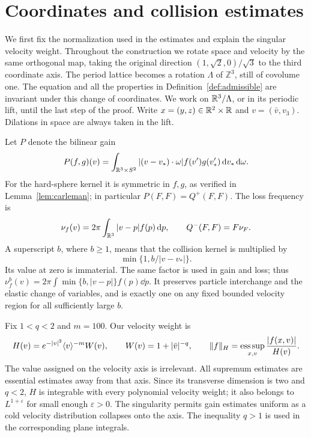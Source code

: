 \section{Coordinates and collision estimates}\label{sec:framework}

We first fix the normalization used in the estimates and explain the
singular velocity weight. Throughout the construction we rotate space
and velocity by the same orthogonal map, taking the original direction
\((1,\sqrt2,0)/\sqrt3\) to the third coordinate axis. The period lattice
becomes a rotation \(\Lambda\) of \(\mathbb Z^3\), still of covolume one.
The equation and all the properties in Definition~\ref{def:admissible}
are invariant under this change of coordinates. We work on
\(\mathbb R^3/\Lambda\), or in its periodic lift, until the last step of the
proof. Write \(x=(y,z)\in\mathbb R^2\times\mathbb R\) and
\(v=(\bar v,v_3)\). Dilations in space are always taken in the lift.

Let \(P\) denote the bilinear gain
\[
 P(f,g)(v)=\int_{\mathbb R^3\times S^2}
 |(v-v_*)\cdot\omega|f(v')g(v_*')\,\mathrm d v_*\,\mathrm d\omega.
\]
For the hard-sphere kernel it is symmetric in \(f,g\), as verified in
Lemma~\ref{lem:carleman}; in particular \(P(F,F)=Q^+(F,F)\).
The loss frequency is
\begin{equation}\label{eq:frequency}
 \nu_f(v)=2\pi\int_{\mathbb R^3}|v-p|f(p)\,\mathrm d p,
 \qquad Q^-(F,F)=F\nu_F.
\end{equation}
A superscript \(b\), where \(b\ge1\), means that the collision kernel is
multiplied by
\begin{equation}\label{eq:cutoff}
 \min\{1,b/|v-v_*|\}.
\end{equation}
Its value at zero is immaterial. The same factor is used in gain and
loss; thus \(\nu_f^b(v)=2\pi\int\min\{b,|v-p|\}f(p)\dd p\).
It preserves particle interchange and the elastic change of variables,
and is exactly one on any fixed bounded velocity region for all
sufficiently large \(b\).

Fix \(1<q<2\) and \(m=100\). Our velocity weight is
\begin{equation}\label{eq:weight}
 H(v)=e^{-|v|^2}\langle v\rangle^{-m}W(v),
 \qquad W(v)=1+|\bar v|^{-q},\qquad
 \|f\|_H=\operatorname*{ess\,sup}_{x,v}\frac{|f(x,v)|}{H(v)}.
\end{equation}
The value assigned on the velocity axis is irrelevant. All supremum
estimates are essential estimates away from that axis. Since its
transverse dimension is two and \(q<2\), \(H\) is integrable with every
polynomial velocity weight; it also belongs to \(L^{1+\varepsilon}\)
for small enough \(\varepsilon>0\). The singularity permits gain
estimates uniform as a cold velocity distribution collapses onto the
axis. The inequality \(q>1\) is used in the corresponding plane
integrals.

